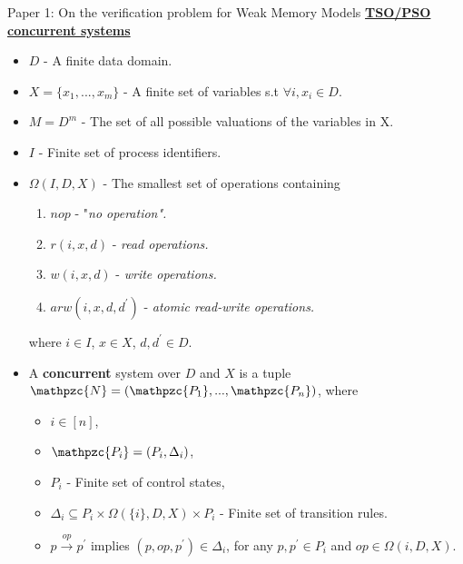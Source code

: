 \documentclass[9pt]{beamer}
\begin{document}
\begin{frame}{Paper 1: On the verification problem for Weak Memory Models}
\underline{\textbf{TSO/PSO concurrent systems}}
\begin{itemize}
\item $D$ - A finite data domain.
\item $X = \{x_1,...,x_m\}$ - A finite set of variables s.t $\forall i, x_i \in D$.
\item $M = D^m$ - The set of all possible valuations of the variables in X.
\item $I$ - Finite set of process identifiers.
\item $\Omega(I,D,X)$ - The smallest set of operations containing
	\begin{enumerate}
	\item $nop$ - "\em{no operation}".
	\item $r(i,x,d)$ - \em{read operations}.
	\item $w(i,x,d)$ - \em{write operations}.
	\item $arw(i,x,d,d^{\prime})$ - \em{atomic read-write operations}.
	\end{enumerate}
	where $i \in I$, $x \in X$, $d,d^{\prime} \in D$.
\pause
\item A \textbf{concurrent} system over $D$ and $X$ is a tuple $\mathpzc{N} = 
      (\mathpzc{P_1},...,\mathpzc{P_n})$, where 
	\begin{itemize}
	\item $i \in [n]$,
	\item $\mathpzc{P_i} = (P_i, \Delta_i)$,
	\item $P_i$ - Finite set of control states,
	\item $\Delta_i \subseteq P_i \times \Omega(\{i\}, D, X) \times P_i$ - Finite
	      set of transition rules.
	\item $p \overset{op}{\longrightarrow} p^{\prime}$ implies $(p, op, p^{\prime}) \in \Delta_i$,
		    for any $p, p^{\prime} \in P_i$ and $op \in \Omega({i}, D, X)$.
	\end{itemize}
\end{itemize}
\end{frame}
\end{document}
